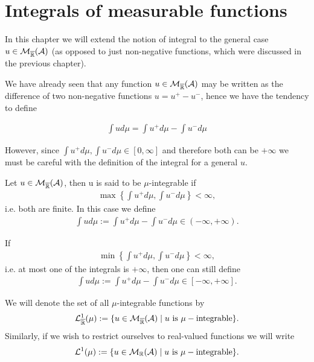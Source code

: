 

\chapter{Integrals of measurable functions}

\label{chp:integrals}

In this chapter we will extend the notion of integral to the general case $u \in \mathcal{M}_{\overline{\mathbb{R}}}(\mathcal{A})$ (as opposed to just non-negative functions, which were discussed in the previous chapter).

We have already seen that any function $u \in \mathcal{M}_{\overline{\mathbb{R}}}(\mathcal{A})$ may be written as the difference of two non-negative functions $u = u^+ - u^-$, hence we have the tendency to define

\begin{align*}
	\int u d\mu = \int u^+ d\mu - \int u^- d \mu
\end{align*}

However, since $\int u^+ d\mu, \int u^- d\mu \in [0, \infty]$ and therefore both can be $+\infty$ we must be careful with the definition of the integral for a general $u$.


\begin{dfn}[$\mu$-integrable]
	\label{dfn:mu-integrable}
	Let $u \in \mathcal{M}_{\overline{\mathbb{R}}}(\mathcal{A})$, then u is said to be $\mu$-integrable if
	\begin{align}
		\max\left\{ \int u^+ d\mu, \int u^- d\mu \right\} < \infty,
	\end{align}
	i.e. both are finite. In this case we define
	\begin{align}
		\int u d\mu := \int u^+ d\mu - \int u^- d\mu \in (-\infty, +\infty).
	\end{align}
\end{dfn}

\begin{remark}
	If
	\begin{align*}
		\min\left\{ \int u^+ d\mu, \int u^- d\mu \right\} < \infty,
	\end{align*}
	i.e. at most one of the integrals is $+\infty$, then one can still define
	\begin{align*}
	\int u d\mu := \int u^+ d\mu - \int u^- d\mu \in [-\infty, +\infty].
	\end{align*}
\end{remark}

We will denote the set of all $\mu$-integrable functions by
\begin{align}
	\mathcal{L}^1_{\overline{\mathbb{R}}}(\mu) := \{u \in \mathcal{M}_{\overline{\mathbb{R}}}(\mathcal{A}) \mid u \text{ is } \mu-\text{integrable}\}.
\end{align}
Similarly, if we wish to restrict ourselves to real-valued functions we will write
\begin{align}
\mathcal{L}^1(\mu) := \{u \in \mathcal{M}_{\mathbb{R}}(\mathcal{A}) \mid u \text{ is } \mu-\text{integrable}\}.
\end{align}

